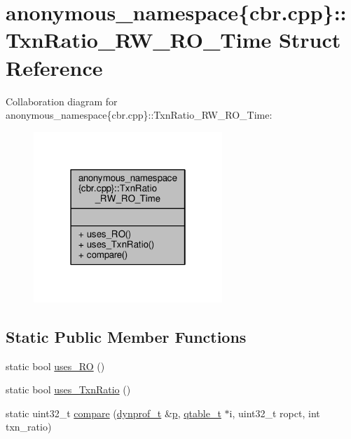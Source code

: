 \hypertarget{structanonymous__namespace_02cbr_8cpp_03_1_1TxnRatio__RW__RO__Time}{\section{anonymous\-\_\-namespace\{cbr.\-cpp\}\-:\-:Txn\-Ratio\-\_\-\-R\-W\-\_\-\-R\-O\-\_\-\-Time Struct Reference}
\label{structanonymous__namespace_02cbr_8cpp_03_1_1TxnRatio__RW__RO__Time}
}


Collaboration diagram for anonymous\-\_\-namespace\{cbr.\-cpp\}\-:\-:Txn\-Ratio\-\_\-\-R\-W\-\_\-\-R\-O\-\_\-\-Time\-:
\nopagebreak
\begin{figure}[H]
\begin{center}
\leavevmode
\includegraphics[width=202pt]{structanonymous__namespace_02cbr_8cpp_03_1_1TxnRatio__RW__RO__Time__coll__graph}
\end{center}
\end{figure}
\subsection*{Static Public Member Functions}
\begin{DoxyCompactItemize}
\item 
static bool \hyperlink{structanonymous__namespace_02cbr_8cpp_03_1_1TxnRatio__RW__RO__Time_a745f4458c9b72cb4bae80d9569e099f4}{uses\-\_\-\-R\-O} ()
\item 
static bool \hyperlink{structanonymous__namespace_02cbr_8cpp_03_1_1TxnRatio__RW__RO__Time_a1249d0705950e57f9b443fed48cdefe8}{uses\-\_\-\-Txn\-Ratio} ()
\item 
static uint32\-\_\-t \hyperlink{structanonymous__namespace_02cbr_8cpp_03_1_1TxnRatio__RW__RO__Time_a81100b94b9eb38b76e15011a8692155f}{compare} (\hyperlink{structstm_1_1dynprof__t}{dynprof\-\_\-t} \&\hyperlink{counted__ptr_8hpp_a5c9f59d7c24e3fd6ceae319a968fc3e0}{p}, \hyperlink{structstm_1_1qtable__t}{qtable\-\_\-t} $\ast$i, uint32\-\_\-t ropct, int txn\-\_\-ratio)
\end{DoxyCompactItemize}



